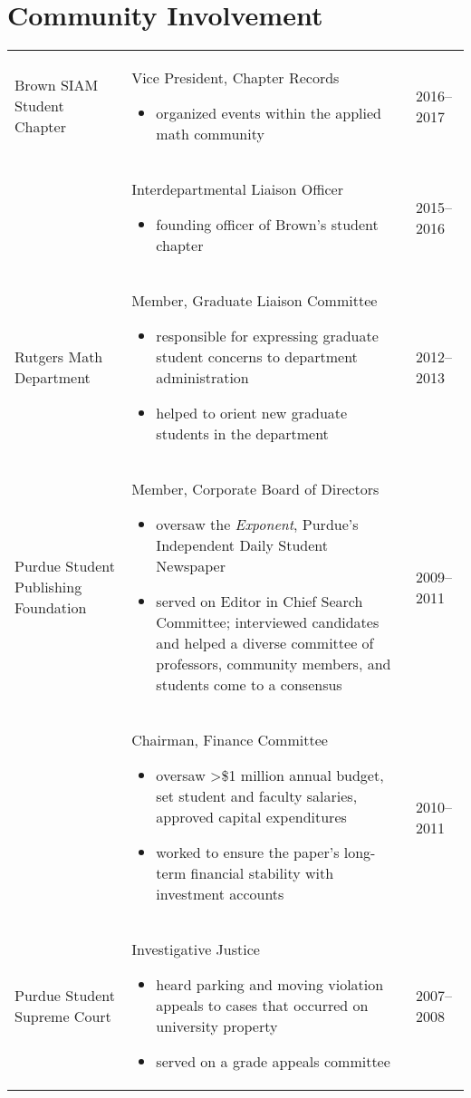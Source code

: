 \section*{Community Involvement}
\begin{longtabu} to \textwidth {X[1.6,l]  X[3,l]  X[.8,r]} 
Brown SIAM \newline Student Chapter
& Vice President, Chapter Records
\begin{itemize}
    \item organized events within the applied math community
\end{itemize}
& 2016--2017 \\
& Interdepartmental Liaison Officer
\begin{itemize}
    \item founding officer of Brown's student chapter
\end{itemize}
& 2015--2016 \\[0.5cm]
Rutgers Math \newline Department
& Member, Graduate Liaison Committee
\begin{itemize}
    \item responsible for expressing graduate student concerns to department administration
    \item helped to orient new graduate students in the department
\end{itemize}
& 2012--2013 \\[0.5cm]
Purdue Student \newline Publishing \newline Foundation
& Member, Corporate Board of Directors
\begin{itemize}
    \item oversaw the \emph{Exponent}, Purdue's Independent Daily Student Newspaper
    \item served on Editor in Chief Search Committee; interviewed candidates and helped a diverse committee of professors, community members, and students come to a consensus
\end{itemize} 
& 2009--2011 \\
& Chairman, Finance Committee
\begin{itemize}
    \item oversaw >\$1 million annual budget, set student and faculty salaries, approved capital expenditures
    \item worked to ensure the paper's long-term financial stability with investment accounts
\end{itemize}
& 2010--2011 \\
Purdue Student \newline Supreme Court
& Investigative Justice
\begin{itemize}
    \item heard parking and moving violation appeals to cases that occurred on university property
    \item served on a grade appeals committee
\end{itemize}
& 2007--2008
\end{longtabu}

